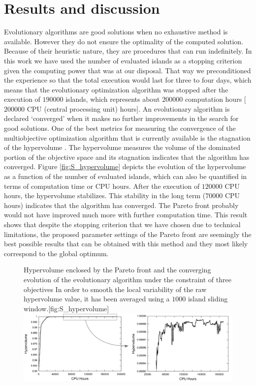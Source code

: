 \section{Results and discussion}
\label{sec:results}

Evolutionary algorithms are good solutions when no exhaustive method is available. However they do not ensure the optimality of the computed solution. Because of their heuristic nature, they are procedures that can run indefinitely. In this work we have used the number of evaluated islands as a stopping criterion given the computing power that was at our disposal. That way we preconditioned the experience so that the total execution would last for three to four days, which means that the evolutionary optimization algorithm was stopped after the execution of $\num{190000}$ islands, which represents about $\num{200000}$ computation hours [$\num{200000}$ CPU (central processing unit) hours]. An evolutionary algorithm is declared ‘converged’ when it makes no further improvements in the search for good solutions. One of the best metrics for measuring the convergence of the multiobjective optimization algorithm that is currently available is the stagnation of the hypervolume \autocites{Fonseca2006,Naujoks2005,Zitzler1998}. The hypervolume measures the volume of the dominated portion of the objective space and its stagnation indicates that the algorithm has converged. Figure \ref{fig:S_hypervolume} depicts the evolution of the hypervolume as a function of the number of evaluated islands, which can also be quantified in terms of computation time or CPU hours. After the execution of $\num{120000}$ CPU hours, the hypervolume stabilizes. This stability in the long term ($\num{70000}$ CPU hours) indicates that the algorithm has converged. The Pareto front probably would not have improved much more with further computation time. This result shows that despite the stopping criterion that we have chosen due to technical limitations, the proposed parameter settings of the Pareto front are seemingly the best possible results that can be obtained with this method and they most likely correspond to the global optimum.

\begin{figure}[!htbp]
\begin{sidecaption}{Hypervolume enclosed by the Pareto front and the converging evolution of the evolutionary algorithm under the constraint of three objectives In order to smooth the local variability of the raw
hypervolume value, it has been averaged using a $\num{1000}$ island sliding window.}[fig:S_hypervolume]
  \centering
 \includegraphics[width=1.0\linewidth]{half_billion_simulation_fig1_hypervolume.png}
  \end{sidecaption}
\end{figure}

